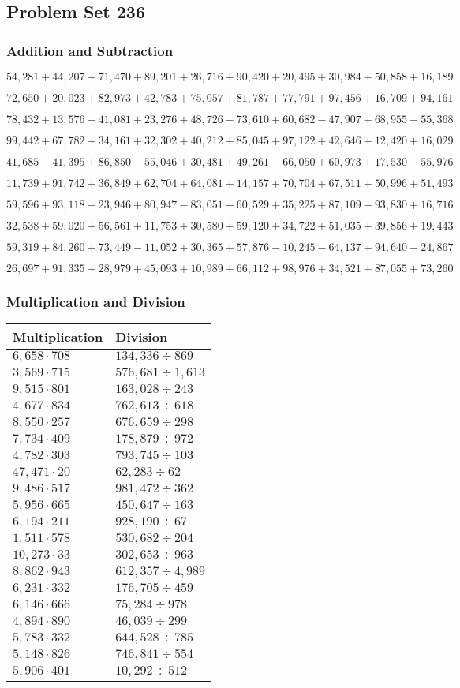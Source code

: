 \hypertarget{problem-set-236}{%
\subsection{Problem Set 236}\label{problem-set-236}}

\hypertarget{addition-and-subtraction}{%
\subsubsection{Addition and
Subtraction}\label{addition-and-subtraction}}

\(54,281+44,207+71,470+89,201+26,716+90,420+20,495+30,984+50,858+16,189\)

\(72,650+20,023+82,973+42,783+75,057+81,787+77,791+97,456+16,709+94,161\)

\(78,432+13,576-41,081+23,276+48,726-73,610+60,682-47,907+68,955-55,368\)

\(99,442+67,782+34,161+32,302+40,212+85,045+97,122+42,646+12,420+16,029\)

\(41,685-41,395+86,850-55,046+30,481+49,261-66,050+60,973+17,530-55,976\)

\(11,739+91,742+36,849+62,704+64,081+14,157+70,704+67,511+50,996+51,493\)

\(59,596+93,118-23,946+80,947-83,051-60,529+35,225+87,109-93,830+16,716\)

\(32,538+59,020+56,561+11,753+30,580+59,120+34,722+51,035+39,856+19,443\)

\(59,319+84,260+73,449-11,052+30,365+57,876-10,245-64,137+94,640-24,867\)

\(26,697+91,335+28,979+45,093+10,989+66,112+98,976+34,521+87,055+73,260\)

\hypertarget{multiplication-and-division}{%
\subsubsection{Multiplication and
Division}\label{multiplication-and-division}}

\begin{longtable}[]{@{}ll@{}}
\toprule
Multiplication & Division\tabularnewline
\midrule
\endhead
\(6,658\cdot708\) & \(134,336÷869\)\tabularnewline
\(3,569\cdot715\) & \(576,681÷1,613\)\tabularnewline
\(9,515\cdot801\) & \(163,028÷243\)\tabularnewline
\(4,677\cdot834\) & \(762,613÷618\)\tabularnewline
\(8,550\cdot257\) & \(676,659÷298\)\tabularnewline
\(7,734\cdot409\) & \(178,879÷972\)\tabularnewline
\(4,782\cdot303\) & \(793,745÷103\)\tabularnewline
\(47,471\cdot20\) & \(62,283÷62\)\tabularnewline
\(9,486\cdot517\) & \(981,472÷362\)\tabularnewline
\(5,956\cdot665\) & \(450,647÷163\)\tabularnewline
\(6,194\cdot211\) & \(928,190÷67\)\tabularnewline
\(1,511\cdot578\) & \(530,682÷204\)\tabularnewline
\(10,273\cdot33\) & \(302,653÷963\)\tabularnewline
\(8,862\cdot943\) & \(612,357÷4,989\)\tabularnewline
\(6,231\cdot332\) & \(176,705÷459\)\tabularnewline
\(6,146\cdot666\) & \(75,284÷978\)\tabularnewline
\(4,894\cdot890\) & \(46,039÷299\)\tabularnewline
\(5,783\cdot332\) & \(644,528÷785\)\tabularnewline
\(5,148\cdot826\) & \(746,841÷554\)\tabularnewline
\(5,906\cdot401\) & \(10,292÷512\)\tabularnewline
\bottomrule
\end{longtable}
